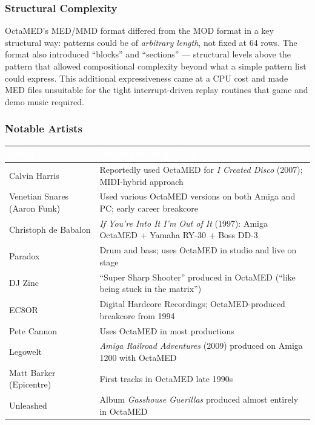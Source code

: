 \documentclass[11pt,letterpaper]{article}
\newcommand{\tableheader}[1]{\textbf{\sffamily\textcolor{white}{#1}}}
\begin{document}
\subsubsection{Structural Complexity}

OctaMED's MED/MMD format differed from the MOD format in a key structural way: patterns could be of \textit{arbitrary length}, not fixed at 64 rows. The format also introduced ``blocks'' and ``sections'' --- structural levels above the pattern that allowed compositional complexity beyond what a simple pattern list could express. This additional expressiveness came at a CPU cost and made MED files unsuitable for the tight interrupt-driven replay routines that game and demo music required.

\subsubsection{Notable Artists}

\begin{center}
\begin{tabularx}{\textwidth}{L{4cm}X}
\toprule
{}
\tableheader{Artist} & \tableheader{OctaMED Connection} \\
\midrule
Calvin Harris & Reportedly used OctaMED for \textit{I Created Disco} (2007); MIDI-hybrid approach \\
Venetian Snares (Aaron Funk) & Used various OctaMED versions on both Amiga and PC; early career breakcore \\
Christoph de Babalon & \textit{If You're Into It I'm Out of It} (1997): Amiga OctaMED + Yamaha RY-30 + Boss DD-3 \\
Paradox & Drum and bass; uses OctaMED in studio and live on stage \\
DJ Zinc & ``Super Sharp Shooter'' produced in OctaMED (``like being stuck in the matrix'') \\
EC8OR & Digital Hardcore Recordings; OctaMED-produced breakcore from 1994 \\
Pete Cannon & Uses OctaMED in most productions \\
Legowelt & \textit{Amiga Railroad Adventures} (2009) produced on Amiga 1200 with OctaMED \\
Matt Barker (Epicentre) & First tracks in OctaMED late 1990s \\
Unleashed & Album \textit{Gasshouse Guerillas} produced almost entirely in OctaMED \\
\bottomrule
\end{tabularx}
\end{center}
\end{document}
